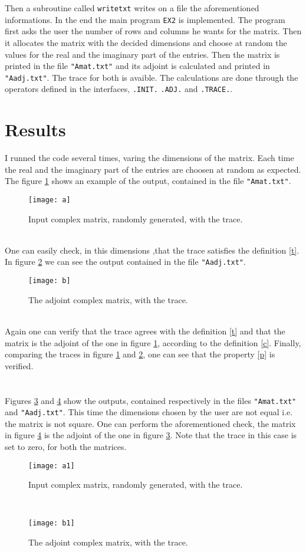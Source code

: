 \documentclass{article}
\begin{document}
Then a subroutine called \texttt{writetxt} writes on a file the aforementioned informations.
In the end the main program \texttt{EX2} is implemented. The program first asks the user the number of rows and columns he wants for the matrix. Then it allocates the matrix with the decided dimensions and choose at random the values for the real and the imaginary part of the entries. Then the matrix is printed in the file \texttt{"Amat.txt"} and its adjoint is calculated and printed in \texttt{"Aadj.txt"}. The trace for both is avaible. The calculations are done through the operators defined in the interfaces, \texttt{.INIT.} \texttt{.ADJ.} and \texttt{.TRACE.}.
\section*{Results}
I runned the code several times, varing the dimensions of the matrix. Each time the real and the imaginary part of the entries are choosen at random as expected. The figure \ref{fig:a} shows an example of the output, contained in the file \texttt{"Amat.txt"}.
\begin{figure}[h!]
\centering
\texttt{[image: a]}
\caption{Input complex matrix, randomly generated, with the trace.}
\label{fig:a}
\end{figure}
\\
One can easily check, in this dimensions ,that the trace satisfies the definition \eqref{t}.
In figure \ref{fig:b} we can see the output contained in the file \texttt{"Aadj.txt"}.
\begin{figure}[h!]
\centering
\texttt{[image: b]}
\caption{The adjoint complex matrix, with the trace.}
\label{fig:b}
\end{figure}
\\
Again one can verify that the trace agrees with the definition \eqref{t} and that the matrix is the adjoint of the one in figure \ref{fig:a}, according to the definition \eqref{c}.
Finally, comparing the traces in figure \ref{fig:a} and \ref{fig:b}, one can see that the property \eqref{p} is verified.
\\
\\
\\Figures \ref{fig:a1} and \ref{fig:b1} show the outputs, contained respectively in the files \texttt{"Amat.txt"} and \texttt{"Aadj.txt"}. This time the dimensions chosen by the user are not equal i.e. the matrix is not square. One can perform the aforementioned check, the matrix in figure \ref{fig:b1} is the adjoint of the one in figure \ref{fig:a1}. Note that the trace in this case is set to zero, for both the matrices.
\newpage
\begin{figure}[h!]
\centering
\texttt{[image: a1]}
\caption{Input complex matrix, randomly generated, with the trace.}
\label{fig:a1}
\end{figure}
\\
\begin{figure}[h!]
\centering
\texttt{[image: b1]}
\caption{The adjoint complex matrix, with the trace.}
\label{fig:b1}
\end{figure}
\end{document}
